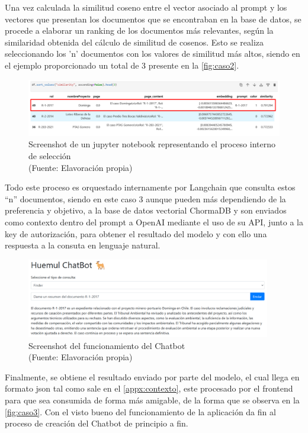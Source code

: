 Una vez calculada la similitud coseno entre el vector asociado al prompt y los vectores que presentan los documentos que se encontraban en la 
base de datos, se procede a elaborar un ranking de los documentos más relevantes, según la similaridad obtenida del cálculo de similitud de cosenos. 
Esto se realiza seleccionando los 'n' documentos con los valores de similitud más altos, siendo en el ejemplo proporcionado un total de 3 
presente en la \autoref{fig:caso2}.

\begin{figure}[ht!]
    \centering
    \includegraphics[width=1\textwidth]{figures/embedding2.png}
    \caption[Screenshot de un jupyter notebook representando el proceso interno de selección]{Screenshot de un jupyter notebook representando el proceso interno de selección\\
    {\scriptsize (Fuente: Elavoración propia)}}
    \label{fig:caso2}
\end{figure}

\newpage

Todo este proceso es orquestado internamente por Langchain que consulta estos ``n'' documentos, siendo en este caso 3 aunque pueden 
más dependiendo de la preferencia y objetivo, a la base de datos vectorial
ChormaDB y son enviados como contexto dentro del prompt a OpenAI mediante el uso de su API, junto a la key de autorización, 
para obtener el resultado del modelo y con ello una respuesta a la consuta en lenguaje natural.



\begin{figure}[ht!]
    \centering
    \includegraphics[width=0.95\textwidth]{figures/website2.png}
    \caption[Screenshot del funcionamiento del Chatbot]{Screenshot del funcionamiento del Chatbot\\
    {\scriptsize (Fuente: Elavoración propia)}}
    \label{fig:caso3}
\end{figure}

Finalmente, se obtiene el resultado enviado por parte del modelo, el cual llega en formato json tal como sale en el \autoref{appx:contexto},
este procesado por el frontend para que sea consumida de forma más amigable, de la forma que se observa en la \autoref{fig:caso3}.
Con el visto bueno del funcionamiento de la aplicación da fin al proceso de creación del Chatbot de principio a fin.
